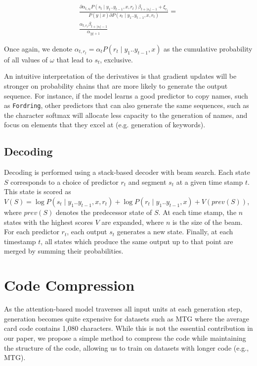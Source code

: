 \documentclass[11pt]{article}
\begin{document}
\begin{align*}
\frac{\partial \alpha_{t,s_t}P(s_t \mid y_1..y_{t-1}, x, r_t)\beta_{t+|s_t|-1} + \xi_{r_t}}{P(y \mid x) \partial P(s_t \mid y_1..y_{t-1}, x, r_t)} = \\ \frac{\alpha_{t,r_t}\beta_{t+|s_t|-1}}{\alpha_{|y|+1}}
\end{align*}

Once again, we denote $\alpha_{t,r_t}=\alpha_{t}P(r_t \mid y_1..y_{t-1}, x)$ as the cumulative probability of all values of $\omega$ that lead to $s_t$, exclusive.

An intuitive interpretation of the derivatives is that gradient updates will be stronger on probability chains that are more likely to generate the output sequence. For instance, if the model learns a good predictor to copy names, such as \texttt{Fordring}, other predictors that can also generate the same sequences, such as the character softmax will allocate less capacity to the generation of names, and focus on elements that they excel at (e.g. generation of keywords).

\subsection{Decoding}

Decoding is performed using a stack-based decoder with beam search. Each state
$S$ corresponds to a choice of predictor $r_t$ and segment $s_t$ at a given
time stamp $t$. This state is scored as $V(S) = \log P(s_t \mid y_1..y_{t-1}, x,
r_t) + \log P(r_t \mid y_1..y_{t-1}, x) + V(prev(S))$, where $prev(S)$ denotes the
predecessor state of $S$. At each time stamp, the $n$ states with the highest
scores $V$ are expanded, where $n$ is the size of the beam. For each predictor
$r_t$, each output $s_t$ generates a new state. Finally, at each time\-stamp
$t$, all states which produce the same output up to that point are merged by
summing their probabilities.

\section{Code Compression}
\label{sec:compression}


As the attention-based model traverses all input units at each generation step,
generation becomes quite expensive for datasets such as MTG where the average
card code contains 1,080 characters. While this is not the essential contribution in our paper, we propose a simple method to compress the code while maintaining the structure of the code, allowing us to train on datasets with longer code (e.g., MTG).
\end{document}
